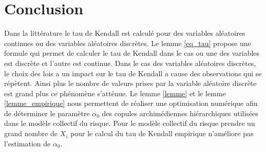 \documentclass{article}
\begin{document}
	\section{Conclusion}
	Dans la littérature le tau de Kendall est calculé pour des variables aléatoires continues ou des variables aléatoires discrètes. Le lemme \ref{eq_tau} propose une formule qui permet de calculer le tau de Kendall dans le cas ou une des variables est discrète et l'autre est continue.
	Dans le cas des variables aléatoires discrètes, le choix des lois a un impact sur le tau de Kendall a cause des observations qui se répètent. Ainsi plus le nombre de valeurs prises par la variable aléatoire discrète est grand plus ce phénomène s'atténue.
	Le lemme \ref{lemme} et le lemme \ref{lemme_empirique} nous permettent de réaliser une optimisation numérique afin de déterminer le paramètre $\alpha_0$ des copules archimédiennes hiérarchiques utilisées dans le modèle collectif du risque. Pour le modèle collectif du risque prendre un grand nombre de $X_i$ pour le calcul du tau de Kendall empirique n'améliore pas l'estimation de $\alpha_0$.


	\newpage
	
	
	 
	 
\end{document}
